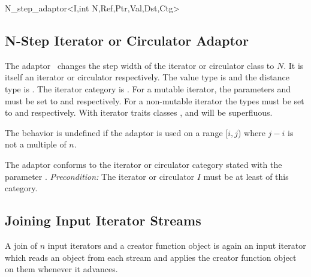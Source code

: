 \begin{ccClassTemplate}{N_step_adaptor<I,int N,Ref,Ptr,Val,Dst,Ctg>}
\subsection{N-Step Iterator or Circulator Adaptor}

\ccDefinition

The adaptor \ccClassTemplateName\ changes the step width of the
iterator or circulator class  to $N$. It is itself an
iterator or circulator respectively. The value type is  and
the distance type is . The iterator category is
. For a mutable iterator, the parameters  and
 must be set to  and  respectively. For a
non-mutable iterator the types must be set to  and
 respectively. With iterator traits classes ,
 and  will be superfluous.

The behavior is undefined if the adaptor is used on a range [$i,j$)
where $j-i$ is not a multiple of $n$.


\ccCreation
{}


\ccOperations

The adaptor conforms to the iterator or circulator category stated
with the parameter . {\em Precondition:\/} The iterator or
circulator $I$ must be at least of this category.

\end{ccClassTemplate}


\subsection{Joining Input Iterator Streams}
\label{sectionJoinInputIterator}

\ccDefinition

A join of $n$ input iterators and a creator function object is again
an input iterator which reads an object from each stream and applies
the creator function object on them whenever it advances.


